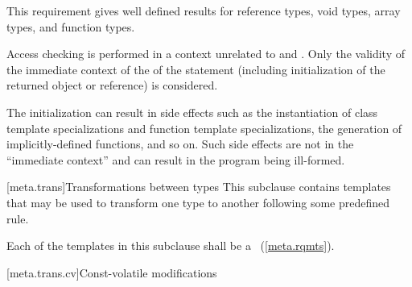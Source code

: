 \begin{note} This requirement gives well defined results for reference types, void
types, array types, and function types.\end{note} Access checking is performed
in a context unrelated to  and . Only the validity of
the immediate context of the  of the  statement
(including initialization of the returned object or reference) is considered. \begin{note} The
initialization can result in side effects such as the
instantiation of class template specializations and function template
specializations, the generation of implicitly-defined functions, and so on. Such
side effects are not in the ``immediate context'' and can result in the program
being ill-formed. \end{note}

[meta.trans]{Transformations between types}
\pnum
This subclause contains templates that may be used to transform one
type to another following some predefined rule.

\pnum
Each of the templates in this subclause shall be a
~(\ref{meta.rqmts}).

[meta.trans.cv]{Const-volatile modifications}

